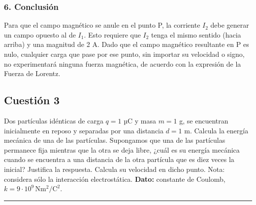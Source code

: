 \subsubsection*{6. Conclusión}
\begin{cajaconclusion}
    Para que el campo magnético se anule en el punto P, la corriente $I_2$ debe generar un campo opuesto al de $I_1$. Esto requiere que $I_2$ tenga el mismo sentido (hacia arriba) y una magnitud de 2 A. Dado que el campo magnético resultante en P es nulo, cualquier carga que pase por ese punto, sin importar su velocidad o signo, no experimentará ninguna fuerza magnética, de acuerdo con la expresión de la Fuerza de Lorentz.
\end{cajaconclusion}
\newpage
\subsection{Cuestión 3}
\label{subsec:C3_2024_jul_ext}

\begin{cajaenunciado}
Dos partículas idénticas de carga $q=1$ µC y masa $m=1$ g, se encuentran inicialmente en reposo y separadas por una distancia $d=1$ m. Calcula la energía mecánica de una de las partículas. Supongamos que una de las partículas permanece fija mientras que la otra se deja libre, ¿cuál es su energía mecánica cuando se encuentra a una distancia de la otra partícula que es diez veces la inicial? Justifica la respuesta. Calcula su velocidad en dicho punto. Nota: considera sólo la interacción electrostática.
\textbf{Dato:} constante de Coulomb, $k=9\cdot10^{9} \, \text{N}\text{m}^2/\text{C}^2$.
\end{cajaenunciado}
\hrule

